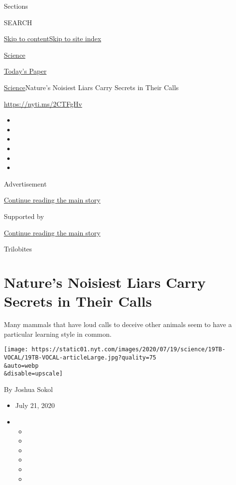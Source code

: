 Sections

SEARCH

\protect\hyperlink{site-content}{Skip to
content}\protect\hyperlink{site-index}{Skip to site index}

\href{https://www.nytimes.com/section/science}{Science}

\href{https://myaccount.nytimes.com/auth/login?response_type=cookie\&client_id=vi}{}

\href{https://www.nytimes.com/section/todayspaper}{Today's Paper}

\href{/section/science}{Science}\textbar{}Nature's Noisiest Liars Carry
Secrets in Their Calls

\url{https://nyti.ms/2CTFgHv}

\begin{itemize}
\item
\item
\item
\item
\item
\item
\end{itemize}

Advertisement

\protect\hyperlink{after-top}{Continue reading the main story}

Supported by

\protect\hyperlink{after-sponsor}{Continue reading the main story}

Trilobites

\hypertarget{natures-noisiest-liars-carry-secrets-in-their-calls}{%
\section{Nature's Noisiest Liars Carry Secrets in Their
Calls}\label{natures-noisiest-liars-carry-secrets-in-their-calls}}

Many mammals that have loud calls to deceive other animals seem to have
a particular learning style in common.

\texttt{[image: https://static01.nyt.com/images/2020/07/19/science/19TB-VOCAL/19TB-VOCAL-articleLarge.jpg?quality=75\\\&auto=webp\\\&disable=upscale]}

By Joshua Sokol

\begin{itemize}
\item
  July 21, 2020
\item
  \begin{itemize}
  \item
  \item
  \item
  \item
  \item
  \item
  \end{itemize}
\end{itemize}

